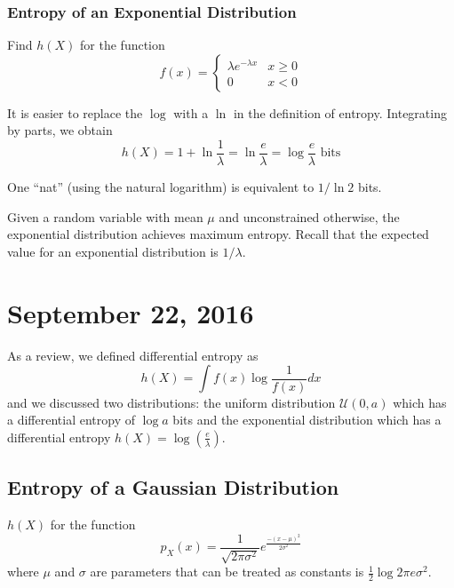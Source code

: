 \documentclass[11pt]{article}
\theoremstyle{definition}
\begin{document}
\subsubsection{Entropy of an Exponential Distribution}

\example Find $h(X)$ for the function 
\begin{equation*} f(x) =	 \begin{cases}
								\lambda e^{-\lambda x} & x \geq 0\\
								0 & x < 0 
							\end{cases}
\end{equation*}

\noindent It is easier to replace the $\log$ with a $\ln$ in the definition of entropy. Integrating by parts, we obtain $$h(X) = 1 + \ln \frac{1}{\lambda} = \ln \frac{e}{\lambda} = \log \frac{e}{\lambda} \text{ bits} $$

\remark One ``nat'' (using the natural logarithm) is equivalent to $1/\ln 2$ bits. 

\theorem Given a random variable with mean $\mu$ and unconstrained otherwise, the exponential distribution achieves maximum entropy. Recall that the expected value for an exponential distribution is $1/\lambda$. 
\section{September 22, 2016}

As a review, we defined differential entropy as $$h(X) = \int f(x) \log \frac{1}{f(x)} dx$$and we discussed two distributions: the uniform distribution $\mathcal{U}(0, a)$ which has a differential entropy of $\log a$ bits and the exponential distribution which has a differential entropy $h(X) = \log (\frac{e}{\lambda})$. 

\subsection{Entropy of a Gaussian Distribution}

\theorem $h(X)$ for the function 
\begin{equation*}
p_X(x) = \frac{1}{\sqrt{2\pi\sigma^2}}e^{\frac{-(x - \mu)^2}{2\sigma^2}}
\end{equation*}
where $\mu$ and $\sigma$ are parameters that can be treated as constants is $\frac{1}{2} \log 2 \pi e \sigma^2$.
\end{document}
